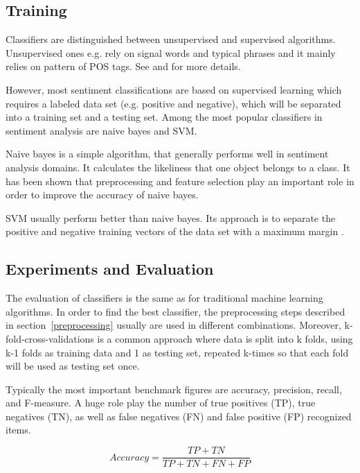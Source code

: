 \documentclass{acm_proc_article-sp}
\begin{document}
\subsection{Training}
Classifiers are distinguished between unsupervised and supervised algorithms. Unsupervised ones e.g. rely on signal words and typical phrases and it mainly relies on pattern of POS tags. See \cite{liu2010sentimentanalysis} and \cite{pang2008opinion} for more details.

However, most sentiment classifications are based on supervised learning which requires a labeled data set (e.g. positive and negative), which will be separated into a training set and a testing set. Among the most popular classifiers in sentiment analysis are naive bayes and SVM. 

Naive bayes is a simple algorithm, that generally performs well in sentiment analysis domains. It calculates the likeliness that one object belongs to a class. It has been shown that preprocessing and feature selection play an important role in order to improve the accuracy of naive bayes.
\cite{ye2009sentiment, ting2011naive}

SVM usually perform better than naive bayes. Its approach is to separate the positive and negative training vectors of the data set with a maximum margin  \cite{ye2009sentiment}.

\subsection{Experiments and Evaluation}
The evaluation of classifiers is the same as for traditional machine learning algorithms. In order to find the best classifier, the preprocessing steps described in section~\ref{preprocessing} usually are used in different combinations. Moreover, k-fold-cross-validations is a common approach where data is split into k folds, using k-1 folds as training data and 1 as testing set, repeated k-times so that each fold will be used as testing set once. 

Typically the most important benchmark figures are accuracy, precision, recall, and F-measure. A huge role play the number of true positives (TP), true negatives (TN), as well as false negatives (FN) and false positive (FP) recognized items. 
\cite{haddi2013therole, ting2011naive, sokolova2006beyond, pak2010twitter, ye2009sentiment}


\begin{equation}
Accuracy = \frac{TP+TN}{TP+TN+FN+FP}
\end{equation}
\end{document}
